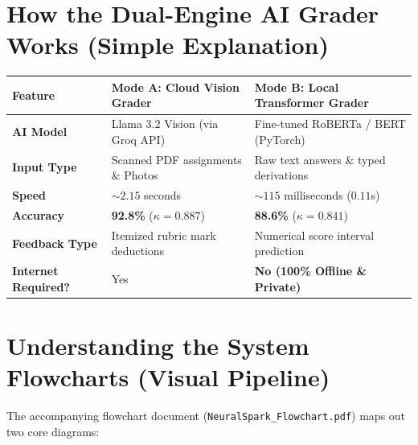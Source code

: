 \documentclass[11pt,a4paper]{article}
\begin{document}
\section{How the Dual-Engine AI Grader Works (Simple Explanation)}

\begin{center}
\small
\begin{tabularx}{\textwidth}{p{3.2cm} p{5.5cm} X}
\toprule
\textbf{Feature} & \textbf{Mode A: Cloud Vision Grader} & \textbf{Mode B: Local Transformer Grader} \\
\midrule
\textbf{AI Model} & Llama 3.2 Vision (via Groq API) & Fine-tuned RoBERTa / BERT (PyTorch) \\
\textbf{Input Type} & Scanned PDF assignments \& Photos & Raw text answers \& typed derivations \\
\textbf{Speed} & $\sim 2.15$ seconds & $\sim 115$ milliseconds ($0.11$s) \\
\textbf{Accuracy} & \textbf{92.8\%} ($\kappa = 0.887$) & \textbf{88.6\%} ($\kappa = 0.841$) \\
\textbf{Feedback Type} & Itemized rubric mark deductions & Numerical score interval prediction \\
\textbf{Internet Required?} & Yes & \textbf{No (100\% Offline \& Private)} \\
\bottomrule
\end{tabularx}
\end{center}

\section{Understanding the System Flowcharts (Visual Pipeline)}
The accompanying flowchart document (\texttt{NeuralSpark\_Flowchart.pdf}) maps out two core diagrams:
\end{document}
